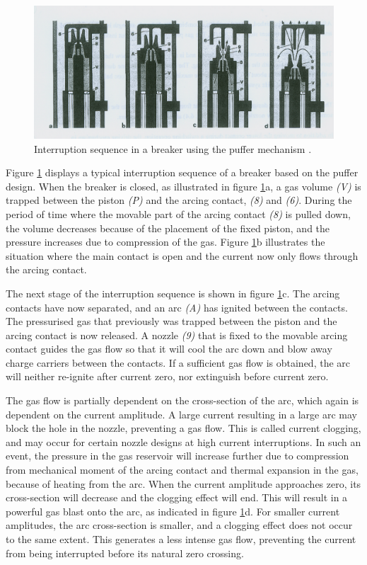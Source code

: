 \documentclass[10pt,b5paper,twoside]{article}
\begin{document}
\begin{figure} [H]
\centering
\includegraphics[scale=0.75]{Bilder/Theory/CircutBreakPuff1.png}
\caption{Interruption sequence in a breaker using the puffer mechanism \cite{bib:HVEbreak}.} \label{fig:CircutBreakPuff1}
\end{figure}

Figure \ref{fig:CircutBreakPuff1} displays a typical interruption sequence of a breaker based on the puffer design. When the breaker is closed, as illustrated in figure \ref{fig:CircutBreakPuff1}a, a gas volume \textit{(V)} is trapped between the piston \textit{(P)} and the arcing contact, \textit{(8)} and \textit{(6)}. During the period of time where the movable part of the arcing contact \textit{(8)} is pulled down, the volume decreases because of the placement of the fixed piston, and the pressure increases due to compression of the gas. Figure \ref{fig:CircutBreakPuff1}b illustrates the situation where the main contact is open and the current now only flows through the arcing contact.

The next stage of the interruption sequence is shown in figure \ref{fig:CircutBreakPuff1}c. The arcing contacts have now separated, and an arc \textit{(A)} has ignited between the contacts. The pressurised gas that previously was trapped between the piston and the arcing contact is now released. A nozzle \textit{(9)} that is fixed to the movable arcing contact guides the gas flow so that it will cool the arc down and blow away charge carriers between the contacts. If a sufficient gas flow is obtained, the arc will neither re-ignite after current zero, nor extinguish before current zero.

The gas flow is partially dependent on the cross-section of the arc, which again is dependent on the current amplitude. A large current resulting in a large arc may block the hole in the nozzle, preventing a gas flow. This is called current clogging, and may occur for certain nozzle designs at high current interruptions. In such an event, the pressure in the gas reservoir will increase further due to compression from mechanical moment of the arcing contact and thermal expansion in the gas, because of heating from the arc. When the current amplitude approaches zero, its cross-section will decrease and the clogging effect will end. This will result in a powerful gas blast onto the arc, as indicated in figure \ref{fig:CircutBreakPuff1}d. For smaller current amplitudes, the arc cross-section is smaller, and a clogging effect does not occur to the same extent. This generates a less intense gas flow, preventing the current from being interrupted before its natural zero crossing.
\end{document}
